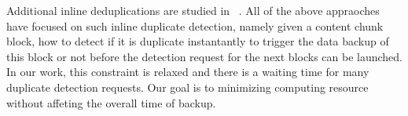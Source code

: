 Additional inline deduplications are studied in ~\cite{sparseindex09,idedup}. All of the above appraoches have focused on
such inline duplicate detection, namely given a content chunk block, how to detect if it is duplicate instantantly
to trigger the data backup of this block or not before the detection request for the next blocks can be launched. 
In our work, this constraint is relaxed and 
there is a waiting time for many duplicate detection requests. Our goal is to minimizing  computing  resource without
affeting the overall time of backup. 

